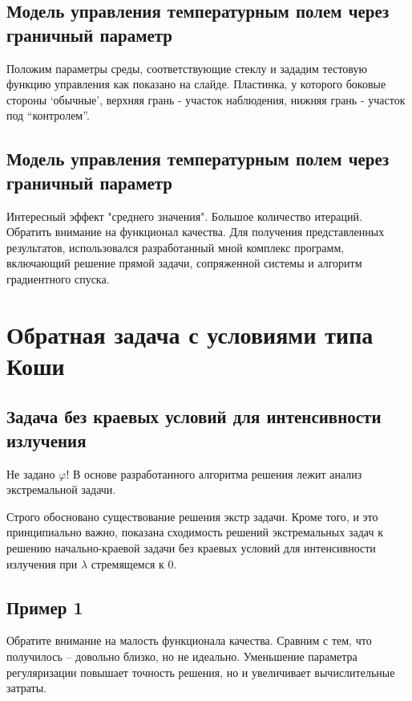 \documentclass[8pt,a4paper]{article}
\begin{document}
    \vspace{10cm}
    \subsection*{Модель управления температурным полем через граничный параметр}
    Положим параметры среды, соответствующие стеклу и зададим тестовую функцию управления
    как показано на слайде.
    Пластинка, у которого боковые стороны `обычные', верхняя грань - участок наблюдения,
    нижняя грань - участок под ``контролем''.

    \vspace{10cm}
    \subsection*{Модель управления температурным полем через граничный параметр}
    Интересный эффект "среднего значения".
    Большое количество итераций.
    Обратить внимание на функционал качества.
    Для получения представленных результатов, использовался разработанный мной комплекс программ,
    включающий решение прямой задачи, сопряженной системы и алгоритм градиентного спуска.

    \vspace{10cm}
    \section*{Обратная задача с условиями типа Коши}
    \subsection*{Задача без краевых условий для интенсивности излучения}
    Не задано $\varphi$!
    В основе разработанного алгоритма решения лежит анализ экстремальной задачи.

    Строго обосновано существование решения экстр задачи.
    Кроме того, и это принципиально важно, показана сходимость решений экстремальных задач
    к решению начально-краевой задачи без краевых условий для интенсивности излучения при $\lambda$ стремящемся к 0.

    \vspace{10cm}
    \subsection*{Пример 1}
    Обратите внимание на малость функционала качества.
    Сравним с тем, что получилось -- довольно близко, но не идеально.
    Уменьшение параметра регуляризации повышает точность решения,
    но и увеличивает вычислительные затраты.
\end{document}
